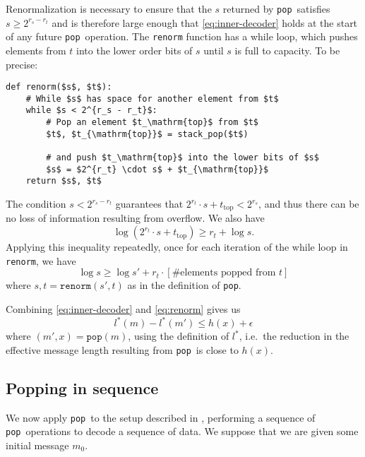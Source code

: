 \documentclass{article}
\theoremstyle{definition}
\newcommand{\pop}{\texttt{pop}}
\begin{document}
  Renormalization is necessary to ensure that the \(s\) returned by \pop\
  satisfies \(s\geq2^{r_s - r_t}\) and is therefore large enough that
  \cref{eq:inner-decoder} holds at the start of any future \pop\ operation. The
  \texttt{renorm} function has a while loop, which pushes elements from \(t\)
  into the lower order bits of \(s\) until \(s\) is full to capacity. To be
  precise:
  \begin{lstlisting}
def renorm($s$, $t$):
    # While $s$ has space for another element from $t$
    while $s < 2^{r_s - r_t}$:
        # Pop an element $t_\mathrm{top}$ from $t$
        $t$, $t_{\mathrm{top}}$ = stack_pop($t$)

        # and push $t_\mathrm{top}$ into the lower bits of $s$
        $s$ = $2^{r_t} \cdot s$ + $t_{\mathrm{top}}$
    return $s$, $t$
  \end{lstlisting}

  The condition \(s < 2^{r_s - r_t}\) guarantees that \(2^{r_t} \cdot s +
  t_{\text{top}} < 2^{r_s}\), and thus there can be no loss of information
  resulting from overflow. We also have
  \begin{equation}
    \log (2^{r_t} \cdot s + t_\text{top}) \geq r_t + \log s.
  \end{equation}
  Applying this inequality repeatedly, once for each iteration of the while
  loop in \texttt{renorm}, we have
  \begin{equation}\label{eq:renorm}
    \log s \geq \log s' + r_t\cdot\left[\text{\# elements popped from
    \(t\)}\right]
  \end{equation}
  where \(s, t = \texttt{renorm}(s', t)\) as in the definition of \pop.

  Combining \cref{eq:inner-decoder} and \cref{eq:renorm} gives us
  \begin{equation}\label{eq:pop-inequality}
    l^*(m) - l^*(m') \leq h(x) + \epsilon
  \end{equation}
  where \((m', x) = \pop(m)\), using the definition of \(l^*\), i.e.\ the
  reduction in the effective message length resulting from \pop\ is close to
  \(h(x)\).


\subsection{Popping in sequence}\label{seq:pop-seq}
  We now apply \pop\ to the setup described in , performing
  a sequence of \pop\ operations to decode a sequence of data. We suppose that
  we are given some initial message \(m_0\).
\end{document}
